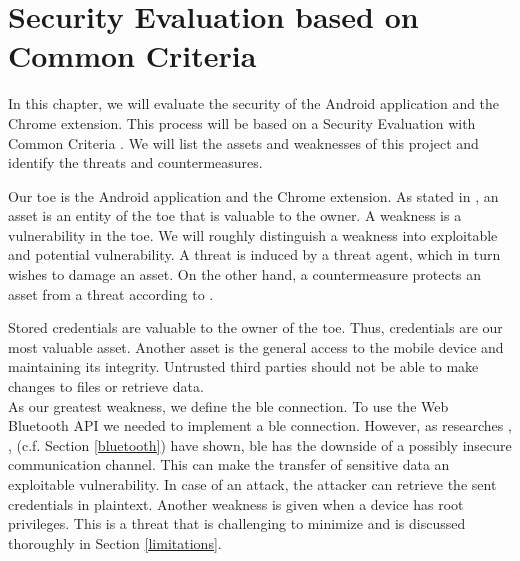 \section{Security Evaluation based on Common Criteria} \label{seceval}
In this chapter, we will evaluate the security of the Android application and the Chrome extension. This process will be based on a Security Evaluation with Common Criteria \cite{CC}. We will list the assets and weaknesses of this project and identify the threats and countermeasures.

Our \gls{toe} is the Android application and the Chrome extension. As stated in \cite{CC}, an asset is an entity of the \gls{toe} that is valuable to the owner. A weakness is a vulnerability in the \gls{toe}. We will roughly distinguish a weakness into exploitable and potential vulnerability.
A threat is induced by a threat agent, which in turn wishes to damage an asset. On the other hand, a countermeasure protects an asset from a threat according to \cite{CC}.

Stored credentials are valuable to the owner of the \gls{toe}. Thus, credentials are our most valuable asset. Another asset is the general access to the mobile device and maintaining its integrity. Untrusted third parties should not be able to make changes to files or retrieve data. \\
%
As our greatest weakness, we define the \gls{ble} connection. To use the Web Bluetooth API we needed to implement a \gls{ble} connection. However, as researches \cite{Ryan13}, \cite{GomezOP12}, \cite{IntroductionBLE} (c.f. Section \ref{bluetooth}) have shown, \gls{ble} has the downside of a possibly insecure communication channel. This can make the transfer of sensitive data an exploitable vulnerability. In case of an attack, the attacker can retrieve the sent credentials in plaintext. Another weakness is given when a device has root privileges. This is a threat that is challenging to minimize and is discussed thoroughly in Section \ref{limitations}.

